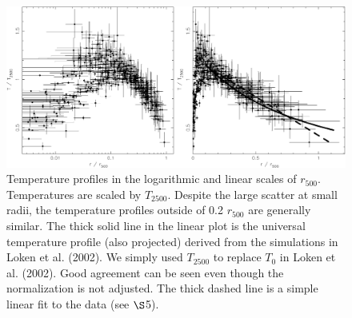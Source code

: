 \documentclass{aastex}
\begin{document}
\begin{figure}
\centerline{\includegraphics[height=0.47\linewidth]{f8.eps}}
  \caption{Temperature profiles in the logarithmic and linear scales of $r_{500}$.
Temperatures are scaled by $T_{2500}$. Despite the large scatter at small radii,
the temperature profiles outside of 0.2 $r_{500}$ are generally similar. The thick
solid line in the linear plot is the universal temperature profile (also projected)
derived from the simulations in Loken et al. (2002). We simply used $T_{2500}$ to replace
$T_{0}$ in Loken et al. (2002). Good agreement can be seen even though the normalization
is not adjusted. The thick dashed line is a simple linear fit to the data (see $\S$5).
}
\end{figure}
\end{document}
